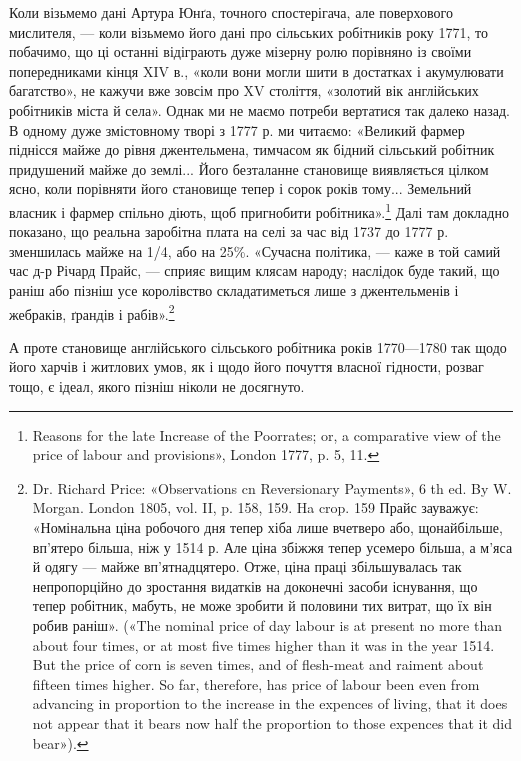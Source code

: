 Коли візьмемо дані Артура Юнґа, точного спостерігача, але
поверхового мислителя, — коли візьмемо його дані про сільських
робітників року 1771, то побачимо, що ці останні відіграють дуже
мізерну ролю порівняно із своїми попередниками кінця XIV в.,
«коли вони могли шити в достатках і акумулювати багатство»,
не кажучи вже зовсім про XV століття, «золотий вік англійських
робітників міста й села». Однак ми не маємо потреби
вертатися так далеко назад. В одному дуже змістовному творі
з 1777 р. ми читаємо: «Великий фармер піднісся майже до рівня
джентельмена, тимчасом як бідний сільський робітник придушений
майже до землі... Його безталанне становище виявляється
цілком ясно, коли порівняти його становище тепер і сорок років
тому... Земельний власник і фармер спільно діють, щоб пригнобити
робітника».\footnote{
Reasons for the late Increase of the Poorrates; or, a comparative
view of the price of labour and provisions», London 1777, p. 5, 11.
} Далі там докладно показано, що реальна
заробітна плата на селі за час від 1737 до 1777 р. зменшилась
майже на 1/4,  або на 25\%. «Сучасна політика, — каже в той самий
час д-р Річард Прайс, — сприяє вищим клясам народу; наслідок
буде такий, що раніш або пізніш усе королівство складатиметься
лише з джентельменів і жебраків, ґрандів і рабів».\footnote{
Dr. Richard Price: «Observations cn Reversionary Payments»,
6 th ed. By W. Morgan. London 1805, vol. II, p. 158, 159. Ha crop. 159
Прайс зауважує: «Номінальна ціна робочого дня тепер хіба лише вчетверо
або, щонайбільше, вп’ятеро більша, ніж у 1514 р. Але ціна збіжжя тепер
усемеро більша, а м’яса й одягу — майже вп’ятнадцятеро. Отже, ціна
праці збільшувалась так непропорційно до зростання видатків на доконечні
засоби існування, що тепер робітник, мабуть, не може зробити й
половини тих витрат, що їх він робив раніш». («The nominal price of
day labour is at present no more than about four times, or at most five times
higher than it was in the year 1514. But the price of corn is seven times,
and of flesh-meat and raiment about fifteen times higher. So far, therefore,
has price of labour been even from advancing in proportion to the
increase in the expences of living, that it does not appear that it bears now
half the proportion to those expences that it did bear»).
}

А проте становище англійського сільського робітника років
1770—1780 так щодо його харчів і житлових умов, як і щодо
його почуття власної гідности, розваг тощо, є ідеал, якого пізніш
ніколи не досягнуто.

